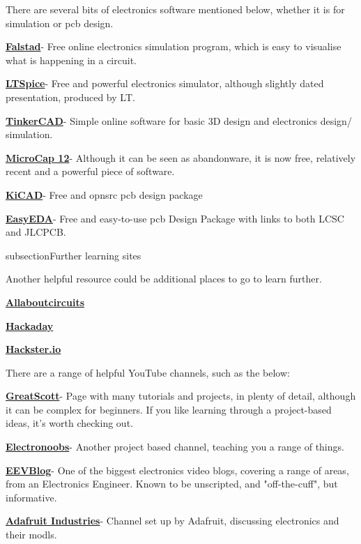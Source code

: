\documentclass[a4paper,11pt]{report}
\let\oldhref\href %
\renewcommand{\href}[2]{\oldhref{#1}{\bfseries#2}}
\begin{document}
There are several bits of electronics software mentioned below, whether it is for simulation or \gls{pcb} design.

\href{https://www.falstad.com/circuit/}{Falstad}- Free online electronics simulation program, which is easy to visualise what is happening in a circuit.

\href{https://www.analog.com/en/design-center/design-tools-and-calculators/lt\gls{spi}ce-simulator.html}{LTSpice}- Free and powerful electronics simulator, although slightly dated presentation, produced by LT.

\href{https://www.tinkercad.com/}{TinkerCAD}- Simple online software for basic 3D design and electronics design/ simulation.

\href{http://www.spectrum-soft.com/download/download.shtm}{MicroCap 12}- Although it can be seen as abandonware, it is now free, relatively recent and a powerful piece of software.

\href{https://www.kicad.org/}{KiCAD}- Free and \gls{opnsrc} \gls{pcb} design package

\href{https://easyeda.com/}{EasyEDA}- Free and easy-to-use \gls{pcb} Design Package with links to both LCSC and JLCPCB.

subsection{Further learning sites}

Another helpful resource could be additional places to go to learn further.

\href{https://www.allaboutcircuits.com/}{Allaboutcircuits}

\href{https://hackaday.com/}{Hackaday}

\href{https://www.hackster.io/}{Hackster.io}

There are a range of helpful YouTube channels, such as the below:

\href{https://www.youtube.com/c/greatscottlab}{GreatScott}- Page with many tutorials and projects, in plenty of detail, although it can be complex for beginners. If you like learning through a project-based ideas, it's worth checking out.

\href{https://www.youtube.com/c/ELECTRONOOBS}{Electronoobs}- Another project based channel, teaching you a range of things.

\href{https://www.youtube.com/c/EevblogDave}{EEVBlog}- One of the biggest electronics video blogs, covering a range of areas, from an Electronics Engineer. Known to be unscripted, and "off-the-cuff", but informative.

\href{https://www.youtube.com/c/adafruit}{Adafruit Industries}- Channel set up by Adafruit, discussing electronics and their \gls{modl}s.
\end{document}
